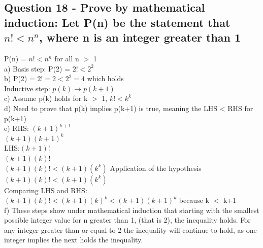 \documentclass{article}
\begin{document}
\subsection{Question 18 - Prove by mathematical induction: Let P(n) be the statement that $n! < n^n$, where n is an integer greater than 1}
P(n) = $n! < n^n$ for all n $>$ 1\\
a) Basis step: P(2) = $2! < 2^2$\\
b) P(2) = $2! = 2 < 2^2 = 4$ which holds\\
Inductive step:
$p(k) \to p(k+1)$\\
c) Assume p(k) holds for k $>$ 1, $k! < k^k$\\
d) Need to prove that p(k) implies p(k+1) is true, meaning the LHS < RHS for p(k+1)\\
e)
RHS: $(k+1)^{k+1}$\\
$(k+1)(k+1)^{k}$\\
LHS:$(k+1)!$\\
$(k+1)(k)!$\\
$(k+1)(k)! < (k+1)(k^k)$ Application of the hypothesis\\
$(k+1)(k)! < (k+1)(k^k)$\\
Comparing LHS and RHS:\\
$(k+1)(k)! < (k+1)(k)^k < (k+1)(k+1)^{k}$ because k $<$ k+1\\
f) These steps show under mathematical induction that starting with the smallest possible integer value for n greater than 1, (that is 2), the inequality holds. For any integer greater than or equal to 2 the inequality will continue to hold, as one integer implies the next holds the inequality.
\end{document}
